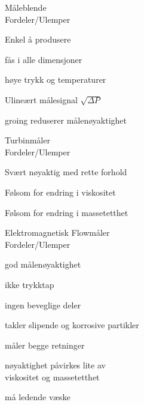 \documentclass[avery5371,grid,frame]{flashcards}
\begin{document}

\begin{flashcard}{Måleblende\\Fordeler/Ulemper}
	\begin{multicols}{2}
		\begin{description}
			\item [Fordeler]
			\item Enkel å produsere
			\item fås i alle dimensjoner
			\item høye trykk og temperaturer
		\columnbreak
			\item [Ulemper]
			\item  Ulineært målesignal $\sqrt{\Delta P}$ 
			\item  groing reduserer målenøyaktighet 
		\end{description}
	\end{multicols}
\end{flashcard}

\begin{flashcard}{Turbinmåler\\Fordeler/Ulemper}
	\begin{multicols}{2}
		\begin{description}
			\item [Fordeler]
			\item Svært nøyaktig med rette forhold
		\columnbreak
			\item [Ulemper]
			\item Følsom for endring i viskositet
			\item Følsom for endring i massetetthet
		\end{description}
	\end{multicols}
\end{flashcard}

\begin{flashcard}{Elektromagnetisk Flowmåler\\Fordeler/Ulemper}
	\begin{multicols}{2}
		\begin{description}
			\item [Fordeler]
			\item god målenøyaktighet
			\item ikke trykktap
			\item ingen beveglige deler
			\item takler slipende og korrosive partikler
			\item måler begge retninger
			\item nøyaktighet påvirkes lite av \\ viskositet og massetetthet
		\columnbreak
			\item [Ulemper]
			\item må ledende væske
		\end{description}
	\end{multicols}
\end{flashcard}
\end{document}
